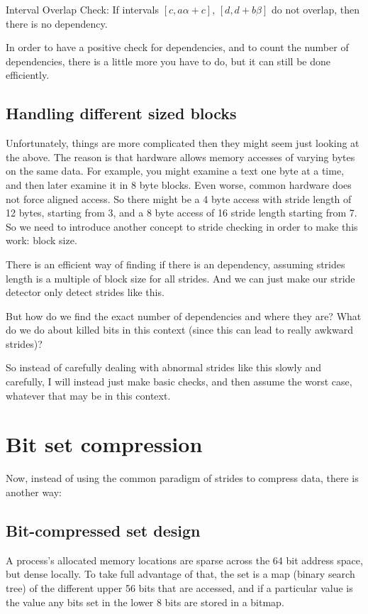 \documentclass[12pt,twoside]{reedthesis}
\begin{document}
		Interval Overlap Check: If intervals $[c,a\alpha+c]$, $[d,d+b\beta]$ do not overlap, then there is no dependency. 
		
		In order to have a positive check for dependencies, and to count the number of dependencies, there is a little more you have to do, but it can still be done efficiently. 
		
		\subsection{Handling different sized blocks}
		
		Unfortunately, things are more complicated then they might seem just looking at the above. 
		The reason is that hardware allows memory accesses of varying bytes on the same data. For example, you might examine a text one byte at a time, and then later examine it in 8 byte blocks. Even worse, common hardware does not force aligned access. So there might be a 4 byte access with stride length of 12 bytes, starting from 3, and a 8 byte access of 16 stride length starting from 7. So we need to introduce another concept to stride checking in order to make this work: block size. 
		
		There is an efficient way of finding if there is an dependency, assuming strides length is a multiple of block size for all strides. And we can just make our stride detector only detect strides like this.
		
		But how do we find the exact number of dependencies and where they are? What do we do about killed bits in this context (since this can lead to really awkward strides)? 
		
		So instead of carefully dealing with abnormal strides like this slowly and carefully, I will instead just make basic checks, and then assume the worst case, whatever that may be in this context. 
		
	\section{Bit set compression}
		
		Now, instead of using the common paradigm of strides to compress data, there is another way: 
		
		\subsection{Bit-compressed set design}
		
		A process's allocated memory locations are sparse across the 64 bit address space, but dense locally. To take full advantage of that, the set is a map (binary search tree) of the different upper 56 bits that are accessed, and if a particular value is  the value any bits set in the lower 8 bits are stored in a bitmap. 
		
\end{document}
